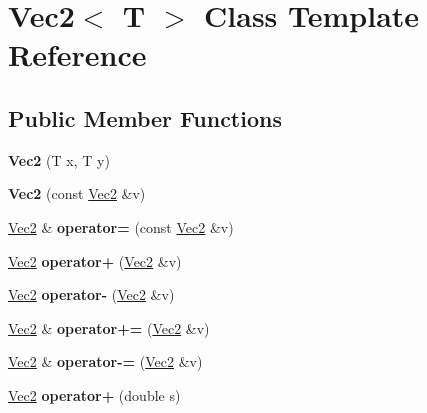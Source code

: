 \hypertarget{classVec2}{}\section{Vec2$<$ T $>$ Class Template Reference}
\label{classVec2}
\subsection*{Public Member Functions}
\begin{DoxyCompactItemize}
\item 
\mbox{\label{classVec2_a43581c2c510e3731cbe9f49a328d73b9}} 
{\bfseries Vec2} (T x, T y)
\item 
\mbox{\label{classVec2_a75d06e735d280d9812a8bc1d2ecb4e94}} 
{\bfseries Vec2} (const \mbox{\hyperlink{classVec2}{Vec2}} \&v)
\item 
\mbox{\label{classVec2_ad31c26f71af2b9068479184b9c829e18}} 
\mbox{\hyperlink{classVec2}{Vec2}} \& {\bfseries operator=} (const \mbox{\hyperlink{classVec2}{Vec2}} \&v)
\item 
\mbox{\label{classVec2_a36d559c499e2d65d70924f676304088e}} 
\mbox{\hyperlink{classVec2}{Vec2}} {\bfseries operator+} (\mbox{\hyperlink{classVec2}{Vec2}} \&v)
\item 
\mbox{\label{classVec2_a5be561da46e1fe458c529f963c75a401}} 
\mbox{\hyperlink{classVec2}{Vec2}} {\bfseries operator-\/} (\mbox{\hyperlink{classVec2}{Vec2}} \&v)
\item 
\mbox{\label{classVec2_a72caf7f8ba74a744fdc2fb03c9b23bad}} 
\mbox{\hyperlink{classVec2}{Vec2}} \& {\bfseries operator+=} (\mbox{\hyperlink{classVec2}{Vec2}} \&v)
\item 
\mbox{\label{classVec2_a6d8c45f2494723f143543a5cafb71534}} 
\mbox{\hyperlink{classVec2}{Vec2}} \& {\bfseries operator-\/=} (\mbox{\hyperlink{classVec2}{Vec2}} \&v)
\item 
\mbox{\label{classVec2_a352b2d1d132c056ebb0dd938df271658}} 
\mbox{\hyperlink{classVec2}{Vec2}} {\bfseries operator+} (double s)
\item 
\mbox{\label{classVec2_a37dd4e38d9e36d6650c084f451a615b6}} 

\end{DoxyCompactItemize}
